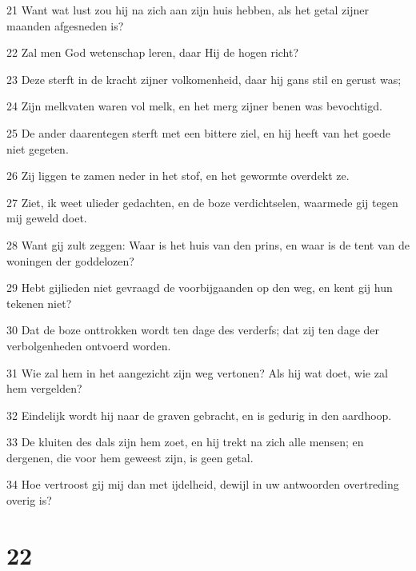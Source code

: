 \par 21 Want wat lust zou hij na zich aan zijn huis hebben, als het getal zijner maanden afgesneden is?
\par 22 Zal men God wetenschap leren, daar Hij de hogen richt?
\par 23 Deze sterft in de kracht zijner volkomenheid, daar hij gans stil en gerust was;
\par 24 Zijn melkvaten waren vol melk, en het merg zijner benen was bevochtigd.
\par 25 De ander daarentegen sterft met een bittere ziel, en hij heeft van het goede niet gegeten.
\par 26 Zij liggen te zamen neder in het stof, en het gewormte overdekt ze.
\par 27 Ziet, ik weet ulieder gedachten, en de boze verdichtselen, waarmede gij tegen mij geweld doet.
\par 28 Want gij zult zeggen: Waar is het huis van den prins, en waar is de tent van de woningen der goddelozen?
\par 29 Hebt gijlieden niet gevraagd de voorbijgaanden op den weg, en kent gij hun tekenen niet?
\par 30 Dat de boze onttrokken wordt ten dage des verderfs; dat zij ten dage der verbolgenheden ontvoerd worden.
\par 31 Wie zal hem in het aangezicht zijn weg vertonen? Als hij wat doet, wie zal hem vergelden?
\par 32 Eindelijk wordt hij naar de graven gebracht, en is gedurig in den aardhoop.
\par 33 De kluiten des dals zijn hem zoet, en hij trekt na zich alle mensen; en dergenen, die voor hem geweest zijn, is geen getal.
\par 34 Hoe vertroost gij mij dan met ijdelheid, dewijl in uw antwoorden overtreding overig is?

\chapter{22}

